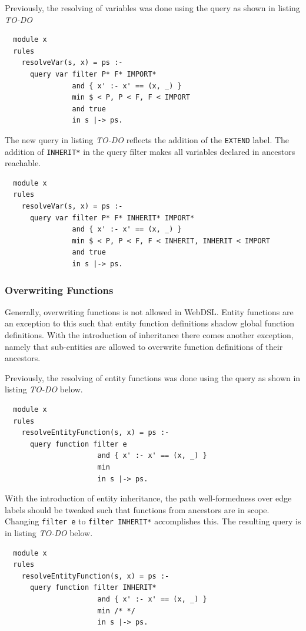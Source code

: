       Previously, the resolving of variables was done using the query as shown in listing \emph{TO-DO}
      \begin{verbatim}
  module x
  rules
    resolveVar(s, x) = ps :-
      query var filter P* F* IMPORT*
                and { x' :- x' == (x, _) }
                min $ < P, P < F, F < IMPORT
                and true
                in s |-> ps.
      \end{verbatim}
      The new query in listing \emph{TO-DO} reflects the addition of the \texttt{EXTEND} label. The addition of \texttt{INHERIT*} in the query filter makes all variables declared in ancestors reachable.
      \begin{verbatim}
  module x
  rules
    resolveVar(s, x) = ps :-
      query var filter P* F* INHERIT* IMPORT*
                and { x' :- x' == (x, _) }
                min $ < P, P < F, F < INHERIT, INHERIT < IMPORT
                and true
                in s |-> ps.
      \end{verbatim}

    \subsubsection{Overwriting Functions}
      Generally, overwriting functions is not allowed in WebDSL. Entity functions are an exception to this such that entity function definitions shadow global function definitions. With the introduction of inheritance there comes another exception, namely that sub-entities are allowed to overwrite function definitions of their ancestors.

      Previously, the resolving of entity functions was done using the query as shown in listing \emph{TO-DO} below.

      \begin{verbatim}
  module x
  rules
    resolveEntityFunction(s, x) = ps :-
      query function filter e
                      and { x' :- x' == (x, _) }
                      min
                      in s |-> ps.
      \end{verbatim}

      With the introduction of entity inheritance, the path well-formedness over edge labels should be tweaked such that functions from ancestors are in scope. Changing \texttt{filter e} to \texttt{filter INHERIT*} accomplishes this. The resulting query is in listing \emph{TO-DO} below.

      \begin{verbatim}
  module x
  rules
    resolveEntityFunction(s, x) = ps :-
      query function filter INHERIT*
                      and { x' :- x' == (x, _) }
                      min /* */
                      in s |-> ps.
      \end{verbatim}

